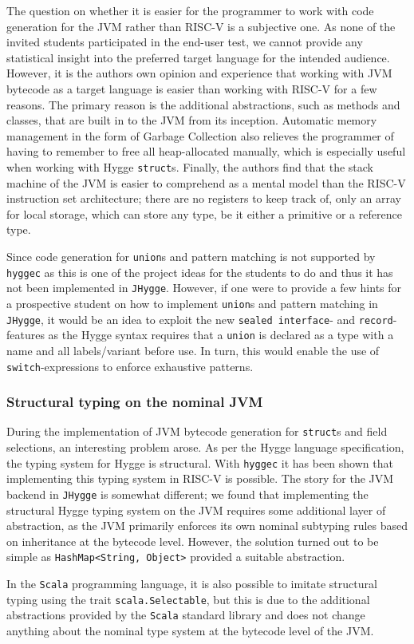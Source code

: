 The question on whether it is easier for the programmer to work with code generation for the JVM
rather than RISC-V is a subjective one. As none of the invited students participated in the end-user test, we cannot provide any statistical insight
into the preferred target language for the intended audience. However, it is the authors own opinion and experience that working with JVM bytecode as
a target language is easier than working with RISC-V for a few reasons. The primary reason is the additional abstractions, such as methods and classes,
that are built in to the JVM from its inception. Automatic memory management in the form of Garbage Collection also relieves the programmer of having
to remember to free all heap-allocated manually, which is especially useful when working with Hygge \texttt{struct}s. Finally, the authors find that
the stack machine of the JVM is easier to comprehend as a mental model than the RISC-V instruction set architecture; there are no registers to keep
track of, only an array for local storage, which can store any type, be it either a primitive or a reference type.

Since code generation for \texttt{union}s and pattern matching is not supported by \texttt{hyggec} as this is one of the project ideas for the students
to do and thus it has not been implemented in \texttt{JHygge}. However, if one were to provide a few hints for a prospective student on how to implement
\texttt{union}s and pattern matching in \texttt{JHygge}, it would be an idea to exploit the new \texttt{sealed interface}- and \texttt{record}-features
as the Hygge syntax requires that a \texttt{union} is declared as a type with a name and all labels/variant before use. In turn, this would enable
the use of \texttt{switch}-expressions to enforce exhaustive patterns.

\subsubsection{Structural typing on the nominal JVM}

During the implementation of JVM bytecode generation for \texttt{struct}s and field selections, an interesting problem arose.
As per the Hygge language specification, the typing system for Hygge is structural. With \texttt{hyggec} it has been shown
that implementing this typing system in RISC-V is possible. The story for the JVM backend in \texttt{JHygge} is somewhat different;
we found that implementing the structural Hygge typing system on the JVM requires some additional layer of abstraction, as
the JVM primarily enforces its own nominal subtyping rules based on inheritance at the bytecode level.
However, the solution turned out to be simple as \texttt{HashMap<String, Object>} provided a suitable abstraction.

In the \texttt{Scala} programming language, it is also possible to imitate structural typing using the trait \texttt{scala.Selectable}\cite{scala3}, but this is
due to the additional abstractions provided by the \texttt{Scala} standard library and does not change anything about the nominal
type system at the bytecode level of the JVM.

